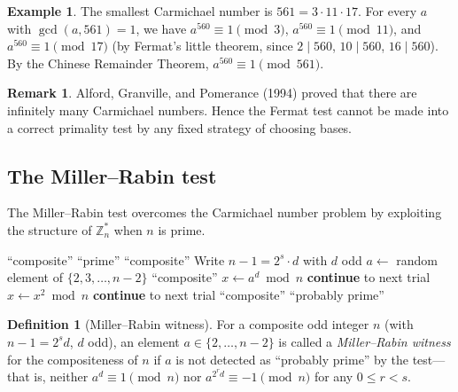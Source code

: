 \documentclass[twoside,12pt]{book}
\theoremstyle{plain}
\theoremstyle{definition}
\newtheorem{definition}[theorem]{Definition}
\newtheorem{example}[theorem]{Example}
\newtheorem{remark}[theorem]{Remark}
\theoremstyle{remark}
\begin{document}
\begin{example}
The smallest Carmichael number is $561 = 3 \cdot 11 \cdot 17$. For every $a$ with $\gcd(a, 561) = 1$, we have $a^{560} \equiv 1 \pmod{3}$, $a^{560} \equiv 1 \pmod{11}$, and $a^{560} \equiv 1 \pmod{17}$ (by Fermat's little theorem, since $2 \mid 560$, $10 \mid 560$, $16 \mid 560$). By the Chinese Remainder Theorem, $a^{560} \equiv 1 \pmod{561}$.
\end{example}

\begin{remark}
Alford, Granville, and Pomerance (1994) proved that there are infinitely many Carmichael numbers. Hence the Fermat test cannot be made into a correct primality test by any fixed strategy of choosing bases.
\end{remark}

\subsection{The Miller--Rabin test}

The Miller--Rabin test overcomes the Carmichael number problem by exploiting the structure of $\mathbb{Z}_n^*$ when $n$ is prime.

\begin{algorithm}
\caption{Miller--Rabin Primality Test}
\label{alg:miller-rabin}
\begin{algorithmic}[1]
 
        \State \Return ``composite''
    \EndIf
        \State \Return ``prime''
    \EndIf
        \State \Return ``composite''
    \EndIf
    \State Write $n - 1 = 2^s \cdot d$ with $d$ odd
    \State $a \gets$ random element of $\{2, 3, \ldots, n-2\}$
        \State \Return ``composite''
    \EndIf
        \State $x \gets a^d \bmod n$
            \State \textbf{continue} to next trial
        \EndIf
            \State $x \gets x^2 \bmod n$
                \State \textbf{continue} to next trial
            \EndIf
        \EndFor
        \State \Return ``composite''
    \EndFor
    \State \Return ``probably prime''
\EndFunction
\end{algorithmic}
\end{algorithm}

\begin{definition}[Miller--Rabin witness]
For a composite odd integer $n$ (with $n - 1 = 2^s d$, $d$ odd), an element $a \in \{2, \ldots, n-2\}$ is called a \emph{Miller--Rabin witness} for the compositeness of $n$ if $a$ is not detected as ``probably prime'' by the test---that is, neither $a^d \equiv 1 \pmod{n}$ nor $a^{2^r d} \equiv -1 \pmod{n}$ for any $0 \leq r < s$.
\end{definition}
\end{document}
